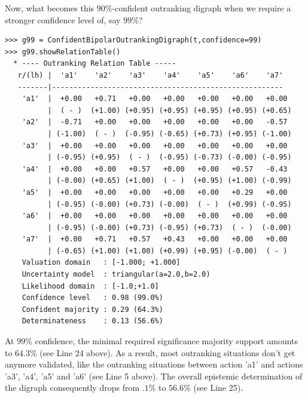 Now, what becomes this 90\%-confident outranking digraph when we require a stronger confidence level of, say $99\%$?
\begin{lstlisting}[basicstyle=\scriptsize]
>>> g99 = ConfidentBipolarOutrankingDigraph(t,confidence=99)
>>> g99.showRelationTable()
  * ---- Outranking Relation Table -----
   r/(lh) |  'a1'    'a2'    'a3'    'a4'    'a5'    'a6'    'a7'	 
   -------|------------------------------------------------------
    'a1'  |  +0.00   +0.71   +0.00   +0.00   +0.00   +0.00   +0.00  
          |  ( - )  (+1.00) (+0.95) (+0.95) (+0.95) (+0.95) (+0.65) 
    'a2'  |  -0.71   +0.00   +0.00   +0.00   +0.00   +0.00   -0.57  
          | (-1.00)  ( - )  (-0.95) (-0.65) (+0.73) (+0.95) (-1.00) 
    'a3'  |  +0.00   +0.00   +0.00   +0.00   +0.00   +0.00   +0.00  
          | (-0.95) (+0.95)  ( - )  (-0.95) (-0.73) (-0.00) (-0.95) 
    'a4'  |  +0.00   +0.00   +0.57   +0.00   +0.00   +0.57   -0.43  
          | (-0.00) (+0.65) (+1.00)  ( - )  (+0.95) (+1.00) (-0.99) 
    'a5'  |  +0.00   +0.00   +0.00   +0.00   +0.00   +0.29   +0.00  
          | (-0.95) (-0.00) (+0.73) (-0.00)  ( - )  (+0.99) (-0.95) 
    'a6'  |  +0.00   +0.00   +0.00   +0.00   +0.00   +0.00   +0.00  
          | (-0.95) (-0.00) (+0.73) (-0.95) (+0.73)  ( - )  (-0.00) 
    'a7'  |  +0.00   +0.71   +0.57   +0.43   +0.00   +0.00   +0.00  
          | (-0.65) (+1.00) (+1.00) (+0.99) (+0.95) (-0.00)  ( - )  
    Valuation domain   : [-1.000; +1.000] 
    Uncertainty model  : triangular(a=2.0,b=2.0) 
    Likelihood domain  : [-1.0;+1.0] 
    Confidence level   : 0.98 (99.0%) 
    Confident majority : 0.29 (64.3%) 
    Determinateness    : 0.13 (56.6%)
\end{lstlisting}

At $99\%$ confidence, the minimal required significance majority support amounts to $64.3\%$ (see Line 24 above). As a result, most outranking situations don't get anymore validated, like the outranking situations between action 'a1' and actions 'a3', 'a4', 'a5' and 'a6' (see Line 5 above). The overall epistemic determination of the digraph consequently drops from $.1\%$ to $56.6\%$ (see Line 25).

